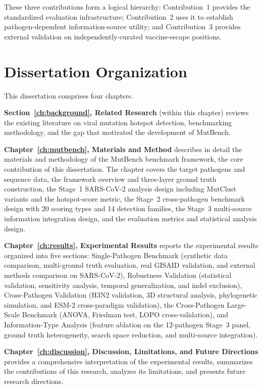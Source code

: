 These three contributions form a logical hierarchy: Contribution~1 provides the standardized evaluation infrastructure; Contribution~2 uses it to establish pathogen-dependent information-source utility; and Contribution~3 provides external validation on independently-curated vaccine-escape positions.

\section{Dissertation Organization}
\label{sec:intro_organization}

This dissertation comprises four chapters.

\textbf{Section~\ref{ch:background}, Related Research} (within this chapter) reviews the existing literature on viral mutation hotspot detection, benchmarking methodology, and the gap that motivated the development of MutBench.

\textbf{Chapter~\ref{ch:mutbench}, Materials and Method} describes in detail the materials and methodology of the MutBench benchmark framework, the core contribution of this dissertation. The chapter covers the target pathogens and sequence data, the framework overview and three-layer ground truth construction, the Stage~1 SARS-CoV-2 analysis design including MutClust variants and the hotspot-score metric, the Stage~2 cross-pathogen benchmark design with 20 scoring types and 14 detection families, the Stage~3 multi-source information integration design, and the evaluation metrics and statistical analysis design.

\textbf{Chapter~\ref{ch:results}, Experimental Results} reports the experimental results organized into five sections: Single-Pathogen Benchmark (synthetic data comparison, multi-ground truth evaluation, real GISAID validation, and external methods comparison on SARS-CoV-2), Robustness Validation (statistical validation, sensitivity analysis, temporal generalization, and indel exclusion), Cross-Pathogen Validation (H3N2 validation, 3D structural analysis, phylogenetic simulation, and ESM-2 cross-paradigm validation), the Cross-Pathogen Large-Scale Benchmark (ANOVA, Friedman test, LOPO cross-validation), and Information-Type Analysis (feature ablation on the 12-pathogen Stage~3 panel, ground truth heterogeneity, search space reduction, and multi-source integration).

\textbf{Chapter~\ref{ch:discussion}, Discussion, Limitations, and Future Directions} provides a comprehensive interpretation of the experimental results, summarizes the contributions of this research, analyzes its limitations, and presents future research directions.

